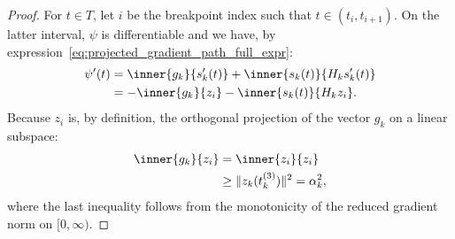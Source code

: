 \begin{proof}
	For $t \in T$, let $i$ be the breakpoint index such that $t\in(t_i,t_{i+1})$. On the latter interval, $\psi$ is differentiable and we have, by expression~\eqref{eq:projected_gradient_path_full_expr}:
	\begin{equation*}
		\begin{split}
			\psi^\prime(t) & = \inner{g_k}{s_k^\prime(t)} + \inner{s_k(t)}{H_ks_k^\prime(t)} \\
			& = -\inner{g_k}{z_i} - \inner{s_k(t)}{H_kz_i}.
		\end{split}
	\end{equation*}
	Because $z_i$ is, by definition, the orthogonal projection of the vector $g_k$ on a linear subspace:
	\begin{equation}\label{eq:ineq_derivative_model_first_order}
		\begin{split}
			\inner{g_k}{z_i} & = \inner{z_i}{z_i} \\
			& \ge \|z_k(t_k^{(3)})\|^2 = \alpha_k^2,
		\end{split}
	\end{equation}
	where the last inequality follows from the monotonicity of the reduced gradient norm on $[0,\infty)$. 
	

\end{proof}
